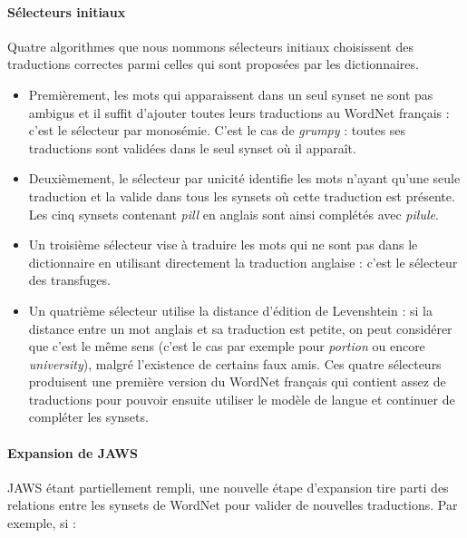 \label{jaws_extraction_heuristics}
\paragraph{Sélecteurs initiaux} Quatre algorithmes que nous nommons sélecteurs
initiaux choisissent des traductions correctes parmi celles qui sont proposées
par les dictionnaires.

\begin{itemize}

    \item Premièrement, les mots qui apparaissent dans un seul synset ne sont
        pas ambigus et il suffit d'ajouter toutes leurs traductions au WordNet
        français : c'est le sélecteur par monosémie. C'est le cas de
        \textit{grumpy} : toutes ses traductions sont validées dans le seul
        synset où il apparaît.

    \item Deuxièmement, le sélecteur par unicité identifie les mots n'ayant
        qu'une seule traduction et la valide dans tous les synsets où cette
        traduction est présente. Les cinq synsets contenant \textit{pill} en
        anglais sont ainsi complétés avec \textit{pilule}.

    \item Un troisième sélecteur vise à traduire les mots qui ne sont pas dans
        le dictionnaire en utilisant directement la traduction anglaise : c'est
        le sélecteur des transfuges.

    \item Un quatrième sélecteur utilise la distance d'édition de Levenshtein :
        si la distance entre un mot anglais et sa traduction est petite, on
        peut considérer que c'est le même sens (c'est le cas par exemple pour
        \textit{portion} ou encore \textit{university}), malgré l'existence de
        certains faux amis. Ces quatre sélecteurs produisent une première
        version du WordNet français qui contient assez de traductions pour
        pouvoir ensuite utiliser le modèle de langue et continuer de compléter
        les synsets.

\end{itemize}

\paragraph{Expansion de JAWS} JAWS étant partiellement rempli, une nouvelle étape d'expansion tire parti des relations entre les synsets de WordNet pour valider de nouvelles traductions. Par exemple, si :

